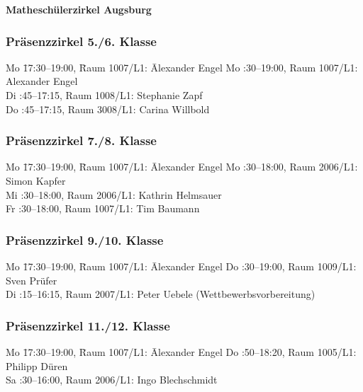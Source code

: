 \documentclass[a4paper,ngerman,14pt]{scrartcl}
\begin{document}
\onehalfspacing

\begin{raggedright}
\Large\textbf{Matheschülerzirkel Augsburg}
\end{raggedright}
\vspace{0.2em}

\subsubsection*{Präsenzzirkel 5./6. Klasse}
\begin{tabbing}
  Mo \= 17:30–19:00, \= Raum 1007/L1: \= Alexander Engel \kill
  Mo :30–19:00, \> Raum 1007/L1: \> Alexander Engel \\
  Di :45–17:15, \> Raum 1008/L1: \> Stephanie Zapf \\
  Do :45–17:15, \> Raum 3008/L1: \> Carina Willbold
\end{tabbing}

\subsubsection*{Präsenzzirkel 7./8. Klasse}

\begin{tabbing}
  Mo \= 17:30–19:00, \= Raum 1007/L1: \= Alexander Engel \kill
  Mo :30–18:00, \> Raum 2006/L1: \> Simon Kapfer \\
  Mi :30–18:00, \> Raum 2006/L1: \> Kathrin Helmsauer \\
  Fr :30–18:00, \> Raum 1007/L1: \> Tim Baumann
\end{tabbing}

\subsubsection*{Präsenzzirkel 9./10. Klasse}

\begin{tabbing}
  Mo \= 17:30–19:00, \= Raum 1007/L1: \= Alexander Engel \kill
  Do :30–19:00, \> Raum 1009/L1: \> Sven Prüfer \\
  Di :15–16:15, \> Raum 2007/L1: \> Peter Uebele (Wettbewerbsvorbereitung)
\end{tabbing}

\subsubsection*{Präsenzzirkel 11./12. Klasse}

\begin{tabbing}
  Mo \= 17:30–19:00, \= Raum 1007/L1: \= Alexander Engel \kill
  Do :50–18:20, \> Raum 1005/L1: \> Philipp Düren \\
  Sa :30–16:00, \> Raum 2006/L1: \> Ingo Blechschmidt
\end{tabbing}
\end{document}
